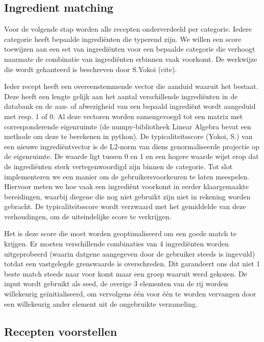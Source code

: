 \documentclass{hogent-article}
\begin{document}
\subsection{Ingredient matching}%

Voor de volgende stap worden alle recepten onderverdeeld per categorie. Iedere categorie heeft bepaalde ingrediënten die typerend zijn. We willen een score toewijzen aan een set van ingrediënten voor een bepaalde categorie die verhoogt naarmate de combinatie van ingrediënten erbinnen vaak voorkomt. De werkwijze die wordt gehanteerd is beschreven door S.Yokoi (cite).

Ieder recept heeft een overeenstemmende vector die aanduid waaruit het bestaat. Deze heeft een lengte gelijk aan het aantal verschillende ingrediënten in de databank en de aan- of afwezigheid van een bepaald ingrediënt wordt aangeduid met resp. 1 of 0. Al deze vectoren worden samengevoegd tot een matrix met  corresponderende eigenruimte (de numpy-bibliotheek Linear Algebra bevat een methode om deze te berekenen in python). De typicaliteitsscore (Yokoi, S.) van een nieuwe ingrediëntvector is de L2-norm van diens genormaliseerde projectie op de eigenruimte. De waarde ligt tussen 0 en 1 en een hogere waarde wijst erop dat de ingrediënten sterk vertegenwoordigd zijn binnen de categorie. Tot slot implementeren we een manier om de gebruikersvoorkeuren te laten meespelen. Hiervoor meten we hoe vaak een ingrediënt voorkomt in eerder klaargemaakte bereidingen, waarbij diegene die nog niet gebruikt zijn niet in rekening worden gebracht. De typicaliteitsscore wordt verzwaard met het gemiddelde van deze verhoudingen, om de uiteindelijke score te verkrijgen.

Het is deze score die moet worden geoptimaliseerd om een goede match te krijgen. Er moeten verschillende combinaties van 4 ingrediënten worden uitgeprobeerd (waarin datgene aangegeven door de gebruiker steeds is ingevuld) totdat een vastgelegde grenswaarde is overschreden. Dit garandeert ons dat niet 1 beste match steeds naar voor komt maar een groep waaruit werd gekozen. De input wordt gebruikt als seed, de overige 3 elementen van de rij worden willekeurig geïnitialiseerd, om vervolgens één voor één te worden vervangen door een willekeurig ander element uit de ongebruikte verzameling. 

\subsection{Recepten voorstellen}%
\end{document}
